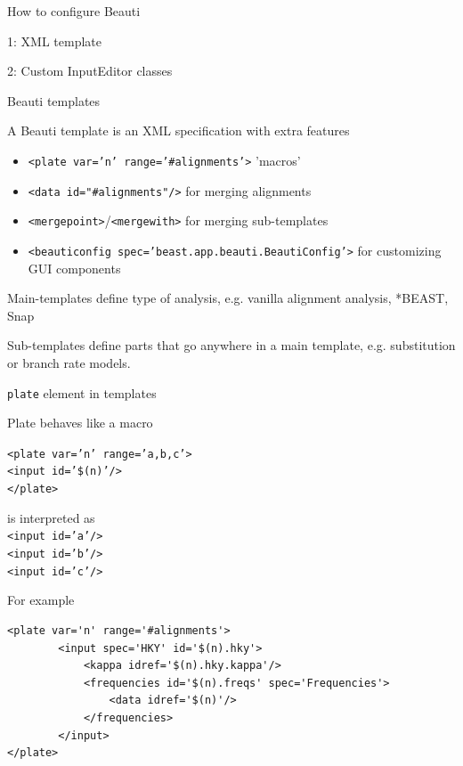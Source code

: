 \documentclass{beamer}
\theoremstyle{definition}
\begin{document}
\begin{frame}[containsverbatim]{How to configure Beauti}

1: XML template\vskip1cm

2: Custom InputEditor classes
\end{frame}


\begin{frame}[containsverbatim]{Beauti templates}

A Beauti template is an XML specification with extra features
\begin{itemize}
\item {\tt <plate var='n' range='#alignments'>} 'macros'
\item {\tt <data id="#alignments"/>} for merging alignments
\item {\tt <mergepoint>}/{\tt <mergewith>} for merging sub-templates
\item {\tt <beauticonfig spec='beast.app.beauti.BeautiConfig'>} for customizing GUI components
\end{itemize}\vskip0.5cm


Main-templates define type of analysis, e.g. vanilla alignment analysis, *BEAST, Snap\vskip0.5cm

Sub-templates define parts that go anywhere in a main template, e.g. substitution or branch rate models.


\end{frame}


\begin{frame}[containsverbatim]{{\tt plate} element in templates}

Plate behaves like a macro

{\tt<plate var='n' range='a,b,c'>\\
 <input id='\$(n)'/>\\
</plate>}

is interpreted as\\
{\tt<input id='a'/>\\
<input id='b'/>\\
<input id='c'/>\\
}
\vskip0.5cm

For example{\small

\begin{verbatim}<plate var='n' range='#alignments'>
        <input spec='HKY' id='$(n).hky'>
            <kappa idref='$(n).hky.kappa'/>
            <frequencies id='$(n).freqs' spec='Frequencies'>
                <data idref='$(n)'/>
            </frequencies>
        </input>
</plate>\end{verbatim}
}

\end{frame}
\end{document}
